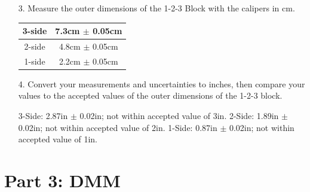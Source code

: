 \documentclass[12pt, letterpaper]{article}
\begin{document}
    \begin{enumerate}
        \item [3.] Measure the outer dimensions of the 1-2-3 Block with the calipers in cm.
        
        \begin{mdframed}
            \begin{center}
                \begin{tabular}{|c|c|}
                    \hline
                    3-side & 7.3cm $\pm$ 0.05cm \\
                    \hline
                    2-side & 4.8cm $\pm$ 0.05cm \\
                    \hline
                    1-side & 2.2cm $\pm$ 0.05cm \\
                    \hline
                \end{tabular}    
            \end{center}
        \end{mdframed}

        \item [4.] Convert your measurements and uncertainties to inches, then compare your values to the accepted values of the outer dimensions of the 1-2-3 block.
        
        \begin{mdframed}
            3-Side: 2.87in $\pm$ 0.02in; not within accepted value of 3in.
            2-Side: 1.89in $\pm$ 0.02in; not within accepted value of 2in.
            1-Side: 0.87in $\pm$ 0.02in; not within accepted value of 1in.
        \end{mdframed}
    \end{enumerate}    


    \section*{Part 3: DMM}
\end{document}

